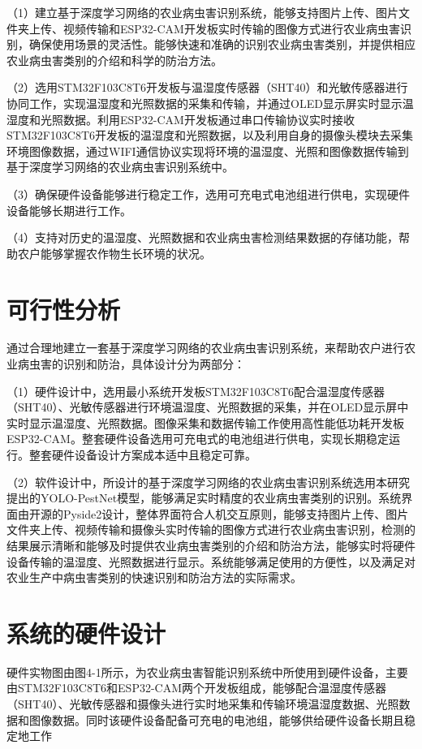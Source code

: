 \documentclass[12pt, a4paper, twoside]{ctexart}
\begin{document}
（1）建立基于深度学习网络的农业病虫害识别系统，能够支持图片上传、图片文件夹上传、视频传输和ESP32-CAM开发板实时传输的图像方式进行农业病虫害识别，确保使用场景的灵活性。能够快速和准确的识别农业病虫害类别，并提供相应农业病虫害类别的介绍和科学的防治方法。

（2）选用STM32F103C8T6开发板与温湿度传感器（SHT40）和光敏传感器进行协同工作，实现温湿度和光照数据的采集和传输，并通过OLED显示屏实时显示温湿度和光照数据。利用ESP32-CAM开发板通过串口传输协议实时接收STM32F103C8T6开发板的温湿度和光照数据，以及利用自身的摄像头模块去采集环境图像数据，通过WIFI通信协议实现将环境的温湿度、光照和图像数据传输到基于深度学习网络的农业病虫害识别系统中。

（3）确保硬件设备能够进行稳定工作，选用可充电式电池组进行供电，实现硬件设备能够长期进行工作。

（4）支持对历史的温湿度、光照数据和农业病虫害检测结果数据的存储功能，帮助农户能够掌握农作物生长环境的状况。


\section{可行性分析}

通过合理地建立一套基于深度学习网络的农业病虫害识别系统，来帮助农户进行农业病虫害的识别和防治，具体设计分为两部分：

（1）硬件设计中，选用最小系统开发板STM32F103C8T6配合温湿度传感器（SHT40）、光敏传感器进行环境温湿度、光照数据的采集，并在OLED显示屏中实时显示温湿度、光照数据。图像采集和数据传输工作使用高性能低功耗开发板ESP32-CAM。整套硬件设备选用可充电式的电池组进行供电，实现长期稳定运行。整套硬件设备设计方案成本适中且稳定可靠。

（2）软件设计中，所设计的基于深度学习网络的农业病虫害识别系统选用本研究提出的YOLO-PestNet模型，能够满足实时精度的农业病虫害类别的识别。系统界面由开源的Pyside2设计，整体界面符合人机交互原则，能够支持图片上传、图片文件夹上传、视频传输和摄像头实时传输的图像方式进行农业病虫害识别，检测的结果展示清晰和能够及时提供农业病虫害类别的介绍和防治方法，能够实时将硬件设备传输的温湿度、光照数据进行显示。系统能够满足使用的方便性，以及满足对农业生产中病虫害类别的快速识别和防治方法的实际需求。


\section{系统的硬件设计}

硬件实物图由图4-1所示，为农业病虫害智能识别系统中所使用到硬件设备，主要由STM32F103C8T6和ESP32-CAM两个开发板组成，能够配合温湿度传感器（SHT40）、光敏传感器和摄像头进行实时地采集和传输环境温湿度数据、光照数据和图像数据。同时该硬件设备配备可充电的电池组，能够供给硬件设备长期且稳定地工作
\end{document}
